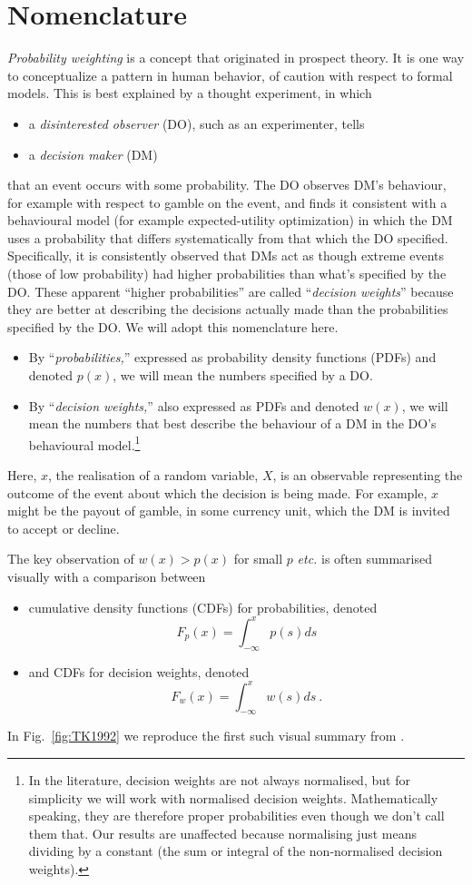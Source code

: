 \documentclass[a4paper, 12pt]{article}
\newcommand{\bi}{\begin{itemize}}
\newcommand{\ei}{\end{itemize}}
\newcommand{\fref}[1]{Fig.~\ref{fig:#1}}
\newcommand{\etc}{{\it etc.}\xspace}
\newcommand{\be}{\begin{equation}}
\newcommand{\ee}{\end{equation}}
\begin{document}
\section{Nomenclature}
{\it Probability weighting} is a concept that originated in prospect theory. It is one way to conceptualize a pattern in human behavior, of caution with respect to formal models.
This is best explained by a thought experiment, in which  
\bi
	\item a \textit{disinterested observer} (DO), such as an experimenter, tells
	\item a \textit{decision maker} (DM) 
\ei
that an event occurs with some probability. The DO observes DM's behaviour, for example with respect to gamble on the event, and finds it consistent with a behavioural model (for example expected-utility optimization) in which the DM uses a probability that differs systematically from that which the DO specified.
% 
Specifically, it is consistently observed that DMs act as though extreme events (those of low probability) had higher probabilities than what's specified by the DO. These apparent ``higher probabilities'' are called ``{\it decision weights}'' because they are better at describing the decisions actually made than the probabilities specified by the DO. We will adopt this nomenclature here. 
\bi
	\item By ``\textit{probabilities,}'' expressed as probability density functions (PDFs) and denoted $p(x)$, we will mean the numbers specified by a DO.
	\item By ``\textit{decision weights,}'' also expressed as PDFs and denoted $w(x)$, we will mean the numbers that best describe the behaviour of a DM in the DO's behavioural model.\footnote{In the literature, decision weights are not always normalised, but for simplicity we will work with normalised decision weights. Mathematically speaking, they are therefore proper probabilities even though we don't call them that. Our results are unaffected because normalising just means dividing by a constant (the sum or integral of the non-normalised decision weights).}
\ei
Here, $x$, the realisation of a random variable, $X$, is an observable representing the outcome of the event about which the decision is being made. For example, $x$ might be the payout of gamble, in some currency unit, which the DM is invited to accept or decline.

The key observation of $w(x)>p(x)$ for small $p$ \etc is often summarised visually with a comparison between 
\bi
\item cumulative density functions (CDFs) for probabilities, denoted 
\be
F_p(x)=\int_{-\infty}^x p(s) ds
\ee
\item and CDFs for decision weights, denoted
\be
F_w(x)=\int_{-\infty}^x w(s) ds ~.
\ee
\ei
In \fref{TK1992} we reproduce the first such visual summary from \cite[p.~310]{TverskyKahneman1992}.
\end{document}
